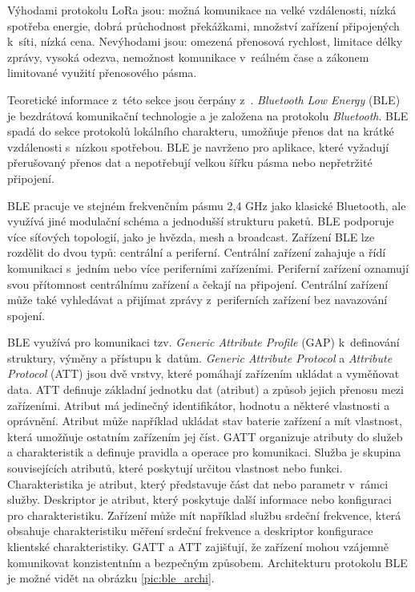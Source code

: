 Výhodami protokolu LoRa jsou: možná komunikace na velké vzdálenosti, nízká spotřeba energie, dobrá průchodnost překážkami, množství zařízení připojených k~síti, nízká cena. Nevýhodami jsou: omezená přenosová rychlost, limitace délky zprávy, vysoká odezva, nemožnost komunikace v~reálném čase a zákonem limitované využití přenosového pásma.


Teoretické informace z~této sekce jsou čerpány z~\cite{BLE_BIB}. \textit{Bluetooth Low Energy} (BLE) je bezdrátová komunikační technologie a je založena na protokolu \textit{Bluetooth}. BLE spadá do sekce protokolů lokálního charakteru, umožňuje přenos dat na krátké vzdálenosti s~nízkou spotřebou. BLE je navrženo pro aplikace, které vyžadují přerušovaný přenos dat a nepotřebují velkou šířku pásma nebo nepřetržité připojení.

BLE pracuje ve stejném frekvenčním pásmu 2,4 GHz jako klasické Bluetooth, ale využívá jiné modulační schéma a jednodušší strukturu paketů. BLE podporuje více síťových topologií, jako je hvězda, mesh a broadcast. Zařízení BLE lze rozdělit do dvou typů: centrální a periferní. Centrální zařízení zahajuje a řídí komunikaci s~jedním nebo více periferními zařízeními. Periferní zařízení oznamují svou přítomnost centrálnímu zařízení a čekají na připojení. Centrální zařízení může také vyhledávat a přijímat zprávy z~periferních zařízení bez navazování spojení.

BLE využívá pro komunikaci tzv. \textit{Generic Attribute Profile} (GAP) k~definování struktury, výměny a přístupu k~datům. \textit{Generic Attribute Protocol} a \textit{Attribute Protocol} (ATT) jsou dvě vrstvy, které pomáhají zařízením ukládat a vyměňovat data. ATT definuje základní jednotku dat (atribut) a způsob jejich přenosu mezi zařízeními. Atribut má jedinečný identifikátor, hodnotu a některé vlastnosti a oprávnění. Atribut může například ukládat stav baterie zařízení a mít vlastnost, která umožňuje ostatním zařízením jej číst. GATT organizuje atributy do služeb a charakteristik a definuje pravidla a operace pro komunikaci. Služba je skupina souvisejících atributů, které poskytují určitou vlastnost nebo funkci. Charakteristika je atribut, který představuje část dat nebo parametr v~rámci služby. Deskriptor je atribut, který poskytuje další informace nebo konfiguraci pro charakteristiku. Zařízení může mít například službu srdeční frekvence, která obsahuje charakteristiku měření srdeční frekvence a deskriptor konfigurace klientské charakteristiky. GATT a ATT zajišťují, že zařízení mohou vzájemně komunikovat konzistentním a bezpečným způsobem. Architekturu protokolu BLE je možné vidět na obrázku \ref{pic:ble_archi}.

